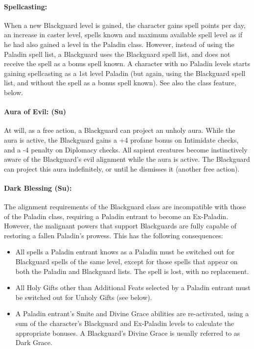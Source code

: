 \paragraph{Spellcasting:} When a new Blackguard level is gained, the character gains spell points per day, an increase in caster level, spells known and maximum available spell level as if he had also gained a level in the Paladin class. However, instead of using the Paladin spell list, a Blackguard uses the Blackguard spell list, and does not receive the  spell as a bonus spell known. A character with no Paladin levels starts gaining spellcasting as a 1st level Paladin (but again, using the Blackguard spell list, and without the  spell as a bonus spell known). See also the  class feature, below.

\paragraph[Aura of Evil]{Aura of Evil: (Su)}
\label{sec:AuroOfEvil} 
At will, as a free action, a Blackguard can project an unholy aura.
While the aura is active, the Blackguard gains a +4 profane bonus on Intimidate checks, and a -4 penalty on Diplomacy checks.
All sapient creatures become instinctively aware of the Blackguard's evil alignment while the aura is active.
The Blackguard can project this aura indefinitely, or until he dismisses it (another free action). 

\paragraph[Dark Blessing]{Dark Blessing (Su):} 
\label{sec:DarkBlessing}
The alignment requirements of the Blackguard class are incompatible with those of the Paladin class, requiring a Paladin entrant to become an Ex-Paladin. However, the malignant powers that support Blackguards are fully capable of restoring a fallen Paladin's prowess. This has the following consequences:
\begin{itemize}
 \item All spells a Paladin entrant knows as a Paladin must be switched out for Blackguard spells of the same level, except for those spells that appear on both the Paladin and Blackguard lists. The  spell is lost, with no replacement.
 \item All Holy Gifts other than Additional Feats selected by a Paladin entrant must be switched out for Unholy Gifts (see below).
 \item A Paladin entrant's Smite and Divine Grace abilities are re-activated, using a sum of the character's Blackguard and Ex-Paladin levels to calculate the appropriate bonuses. A Blackguard's Divine Grace is usually referred to as Dark Grace.
\end{itemize}

